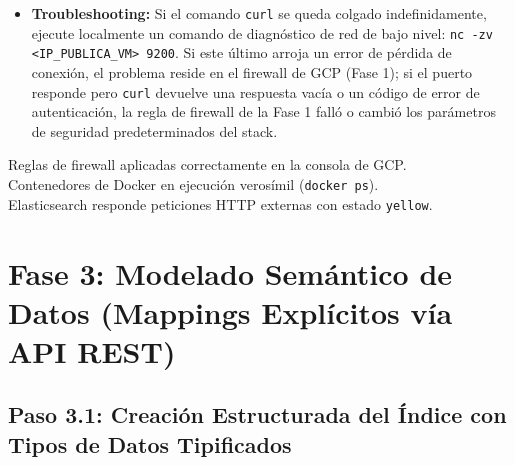 \documentclass[
  coursetitle={Cómputo Nube y Tecnologías Emergentes},
  coursehours={96},
  coursedate={Verano 2026},
  doctype={Práctica},
  otherlangs={english,french},
  authorname={Lázaro},
  authorsurname={Bustio-Martínez},
  authortitle={PhD},
  role={Profesor Investigador},
  email={lbustio@inaoe.mx},
  phone={5559504000},
  ext={7459},
  institution={Instituto Nacional de Astrofísica, Óptica y Electrónica (INAOE)},
  department={Maestría en Ciencias en Tecnologías de Seguridad},
  address={Luis Enrique Erro 1, Sta. Ma. Tonantzintla, San Andrés Cholula, CP 72840, Puebla, México},
  margin={0.5in}
]{../../lbustio_lecture_notes}
\begin{document}
\begin{itemize}
    \item \textbf{Troubleshooting:} Si el comando \texttt{curl} se queda colgado indefinidamente, ejecute localmente un comando de diagnóstico de red de bajo nivel: \texttt{nc -zv <IP\_PUBLICA\_VM> 9200}. Si este último arroja un error de pérdida de conexión, el problema reside en el firewall de GCP (Fase 1); si el puerto responde pero \texttt{curl} devuelve una respuesta vacía o un código de error de autenticación, la regla de firewall de la Fase 1 falló o cambió los parámetros de seguridad predeterminados del stack.
\end{itemize}

\begin{tcolorbox}[colback=green!5!white,colframe=green!60!black,title=\textbf{Checkpoint de Vlidación 1}]
\checkmark Reglas de firewall aplicadas correctamente en la consola de GCP.\\
\checkmark Contenedores de Docker en ejecución verosímil (\texttt{docker ps}).\\
\checkmark Elasticsearch responde peticiones HTTP externas con estado \texttt{yellow}.
\end{tcolorbox}

\section{Fase 3: Modelado Semántico de Datos (Mappings Explícitos vía API REST)}

\subsection{Paso 3.1: Creación Estructurada del Índice con Tipos de Datos Tipificados}
\end{document}
